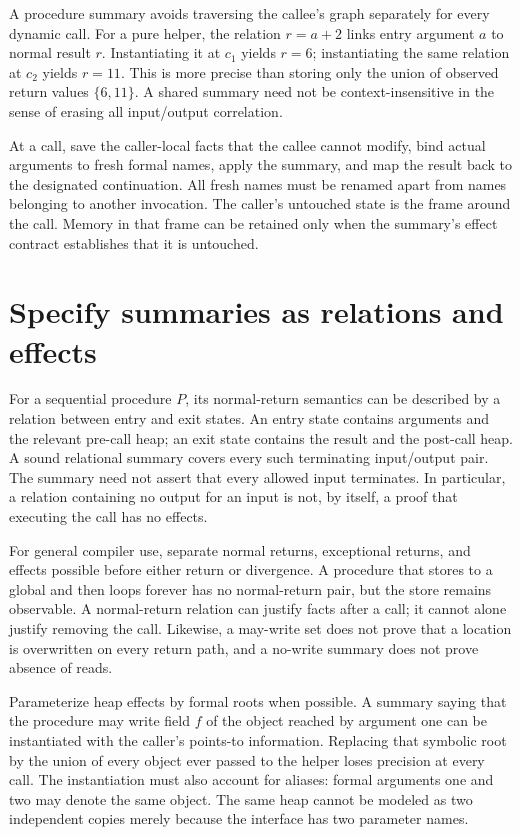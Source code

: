 

A procedure summary avoids traversing the callee's graph separately for every dynamic call.
For a pure helper, the relation $r=a+2$ links entry argument $a$ to normal result $r$.
Instantiating it at $c_1$ yields $r=6$; instantiating the same relation at $c_2$ yields $r=11$.
This is more precise than storing only the union of observed return values $\{6,11\}$.
A shared summary need not be context-insensitive in the sense of erasing all input/output correlation.

At a call, save the caller-local facts that the callee cannot modify, bind actual arguments to fresh formal names, apply the summary, and map the result back to the designated continuation.
All fresh names must be renamed apart from names belonging to another invocation.
The caller's untouched state is the frame around the call.
Memory in that frame can be retained only when the summary's effect contract establishes that it is untouched.

\section{Specify summaries as relations and effects}
\label{sec:ch44-summary-contract}

For a sequential procedure $P$, its normal-return semantics can be described by a relation between entry and exit states.
An entry state contains arguments and the relevant pre-call heap; an exit state contains the result and the post-call heap.
A sound relational summary covers every such terminating input/output pair.
The summary need not assert that every allowed input terminates.
In particular, a relation containing no output for an input is not, by itself, a proof that executing the call has no effects.

For general compiler use, separate normal returns, exceptional returns, and effects possible before either return or divergence.
A procedure that stores to a global and then loops forever has no normal-return pair, but the store remains observable.
A normal-return relation can justify facts after a call; it cannot alone justify removing the call.
Likewise, a may-write set does not prove that a location is overwritten on every return path, and a no-write summary does not prove absence of reads.

Parameterize heap effects by formal roots when possible.
A summary saying that the procedure may write field $f$ of the object reached by argument one can be instantiated with the caller's points-to information.
Replacing that symbolic root by the union of every object ever passed to the helper loses precision at every call.
The instantiation must also account for aliases: formal arguments one and two may denote the same object.
The same heap cannot be modeled as two independent copies merely because the interface has two parameter names.

